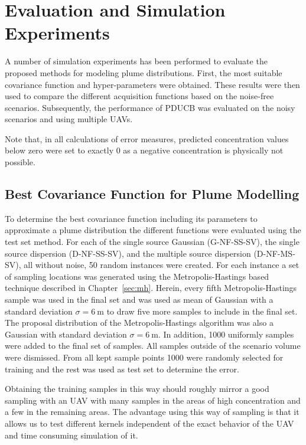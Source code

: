 \chapter{Evaluation and Simulation Experiments}\label{sec:exp}
A number of simulation experiments has been performed to evaluate the proposed 
methods for modeling plume distributions. First, the most suitable covariance 
function and hyper-parameters were obtained. These results were then used to 
compare the different acquisition functions based on the noise-free scenarios.  
Subsequently, the performance of PDUCB was evaluated on the noisy scenarios and 
using multiple UAVs.

Note that, in all calculations of error measures, predicted concentration values 
below zero were set to exactly 0 as a negative concentration is physically not 
possible.

\section{Best Covariance Function for Plume Modelling}\label{sec:bestkernel}
To determine the best covariance function including its parameters to 
approximate a plume distribution the different functions were evaluated using 
the test set method.  For each of the single source Gaussian (G-NF-SS-SV), the 
single source dispersion (D-NF-SS-SV), and the multiple source dispersion 
(D-NF-MS-SV), all without noise, 50 random instances were created. For each 
instance a set of sampling locations was generated using the Metropolis-Hastings 
based technique described in Chapter~\ref{sec:mh}. Herein, every fifth 
Metropolis-Hastings sample was used in the final set and was used as mean of 
Gaussian with a standard deviation $\sigma = \SI{6}{\meter}$ to draw five more 
samples to include in the final set.  The proposal distribution of the 
Metropolis-Hastings algorithm was also a Gaussian with standard deviation 
$\sigma = \SI{6}{\meter}$.  In addition, 1000 uniformly samples were added to 
the final set of samples. All samples outside of the scenario volume were 
dismissed. From all kept sample points 1000 were randomly selected for training 
and the rest was used as test set to determine the error.

Obtaining the training samples in this way should roughly mirror a good sampling 
with an UAV with many samples in the areas of high concentration and a few in 
the remaining areas. The advantage using this way of sampling is that it allows 
us to test different kernels independent of the exact behavior of the UAV and 
time consuming simulation of it.

